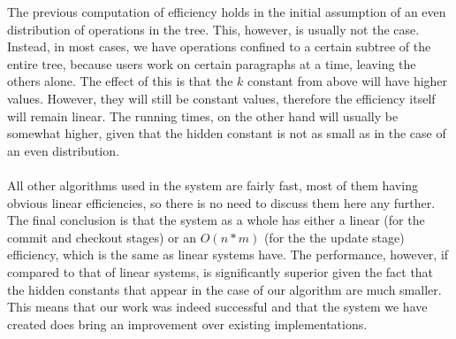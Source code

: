 The previous computation of efficiency holds in the initial assumption of an even distribution of operations
in the tree. This, however, is usually not the case. Instead, in most cases, we have operations confined to
a certain subtree of the entire tree, because users work on certain paragraphs at a time, leaving the others
alone. The effect of this is that the $k$ constant from above will have higher values. However, they will
still be constant values, therefore the efficiency itself will remain linear. The running times, on the other
hand will usually be somewhat higher, given that the hidden constant is not as small as in the case of an even
distribution.\\
\\
All other algorithms used in the system are fairly fast, most of them having obvious linear efficiencies, so
there is no need to discuss them here any further. The final conclusion is that the system as a whole has
either a linear (for the commit and checkout stages) or an $O(n*m)$ (for the the update stage) efficiency,
which is the same as linear systems have. The performance, however, if compared to that of linear systems,
is significantly superior given the fact that the hidden constants that appear in the case of our algorithm
are much smaller. This means that our work was indeed successful and that the system we have created does
bring an improvement over existing implementations.